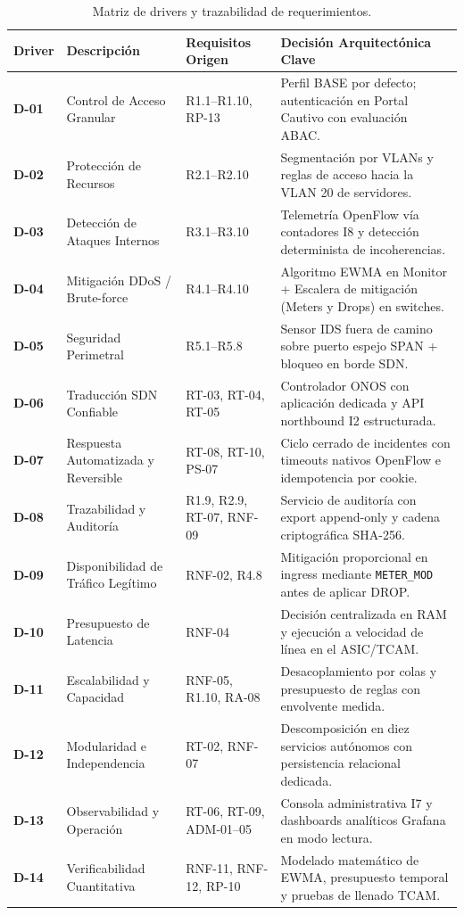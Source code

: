 \documentclass[11pt,a4paper]{report}
\begin{document}
\begin{table}[h!]
\centering
\small
\begin{tabularx}{\linewidth}{p{1.2cm}p{4.2cm}p{3.2cm}X}
\toprule
\textbf{Driver} & \textbf{Descripción} & \textbf{Requisitos Origen} & \textbf{Decisión Arquitectónica Clave} \\
\midrule
\textbf{D-01} & Control de Acceso Granular & R1.1--R1.10, RP-13 & Perfil BASE por defecto; autenticación en Portal Cautivo con evaluación ABAC. \\
\textbf{D-02} & Protección de Recursos & R2.1--R2.10 & Segmentación por VLANs y reglas de acceso hacia la VLAN 20 de servidores. \\
\textbf{D-03} & Detección de Ataques Internos & R3.1--R3.10 & Telemetría OpenFlow vía contadores I8 y detección determinista de incoherencias. \\
\textbf{D-04} & Mitigación DDoS / Brute-force & R4.1--R4.10 & Algoritmo EWMA en Monitor + Escalera de mitigación (Meters y Drops) en switches. \\
\textbf{D-05} & Seguridad Perimetral & R5.1--R5.8 & Sensor IDS fuera de camino sobre puerto espejo SPAN + bloqueo en borde SDN. \\
\textbf{D-06} & Traducción SDN Confiable & RT-03, RT-04, RT-05 & Controlador ONOS con aplicación dedicada y API northbound I2 estructurada. \\
\textbf{D-07} & Respuesta Automatizada y Reversible & RT-08, RT-10, PS-07 & Ciclo cerrado de incidentes con timeouts nativos OpenFlow e idempotencia por cookie. \\
\textbf{D-08} & Trazabilidad y Auditoría & R1.9, R2.9, RT-07, RNF-09 & Servicio de auditoría con export append-only y cadena criptográfica SHA-256. \\
\textbf{D-09} & Disponibilidad de Tráfico Legítimo & RNF-02, R4.8 & Mitigación proporcional en ingress mediante \texttt{METER\_MOD} antes de aplicar DROP. \\
\textbf{D-10} & Presupuesto de Latencia & RNF-04 & Decisión centralizada en RAM y ejecución a velocidad de línea en el ASIC/TCAM. \\
\textbf{D-11} & Escalabilidad y Capacidad & RNF-05, R1.10, RA-08 & Desacoplamiento por colas y presupuesto de reglas con envolvente medida. \\
\textbf{D-12} & Modularidad e Independencia & RT-02, RNF-07 & Descomposición en diez servicios autónomos con persistencia relacional dedicada. \\
\textbf{D-13} & Observabilidad y Operación & RT-06, RT-09, ADM-01--05 & Consola administrativa I7 y dashboards analíticos Grafana en modo lectura. \\
\textbf{D-14} & Verificabilidad Cuantitativa & RNF-11, RNF-12, RP-10 & Modelado matemático de EWMA, presupuesto temporal y pruebas de llenado TCAM. \\
\bottomrule
\end{tabularx}
\caption{Matriz de drivers y trazabilidad de requerimientos.}
\label{tab:drivers}
\end{table}
\end{document}
